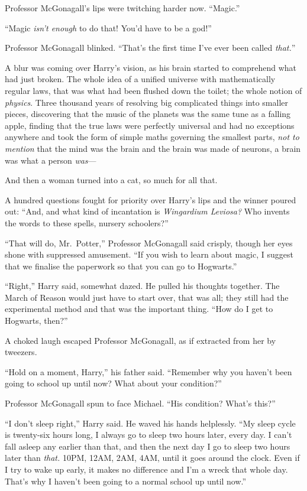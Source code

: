Professor McGonagall's lips were twitching harder now. ``Magic.''

``Magic \emph{isn't enough} to do that! You'd have to be a god!''

Professor McGonagall blinked. ``That's the first time I've ever been
called \emph{that.}''

A blur was coming over Harry's vision, as his brain started to
comprehend what had just broken. The whole idea of a unified universe
with mathematically regular laws, that was what had been flushed down
the toilet; the whole notion of \emph{physics}. Three thousand years of
resolving big complicated things into smaller pieces, discovering that
the music of the planets was the same tune as a falling apple, finding
that the true laws were perfectly universal and had no exceptions
anywhere and took the form of simple maths governing the smallest parts,
\emph{not to mention} that the mind was the brain and the brain was made
of neurons, a brain was what a person \emph{was}---

And then a woman turned into a cat, so much for all that.

A hundred questions fought for priority over Harry's lips and the winner
poured out: ``And, and what kind of incantation is \emph{Wingardium
Leviosa?} Who invents the words to these spells, nursery schoolers?''

``That will do, Mr.~Potter,'' Professor McGonagall said crisply, though
her eyes shone with suppressed amusement. ``If you wish to learn about
magic, I suggest that we finalise the paperwork so that you can go to
Hogwarts.''

``Right,'' Harry said, somewhat dazed. He pulled his thoughts together.
The March of Reason would just have to start over, that was all; they
still had the experimental method and that was the important thing.
``How do I get to Hogwarts, then?''

A choked laugh escaped Professor McGonagall, as if extracted from her by
tweezers.

``Hold on a moment, Harry,'' his father said. ``Remember why you haven't
been going to school up until now? What about your condition?''

Professor McGonagall spun to face Michael. ``His condition? What's
this?''

``I don't sleep right,'' Harry said. He waved his hands helplessly. ``My
sleep cycle is twenty-six hours long, I always go to sleep two hours
later, every day. I can't fall asleep any earlier than that, and then
the next day I go to sleep two hours later than \emph{that.} 10PM, 12AM,
2AM, 4AM, until it goes around the clock. Even if I try to wake up
early, it makes no difference and I'm a wreck that whole day. That's why
I haven't been going to a normal school up until now.''

